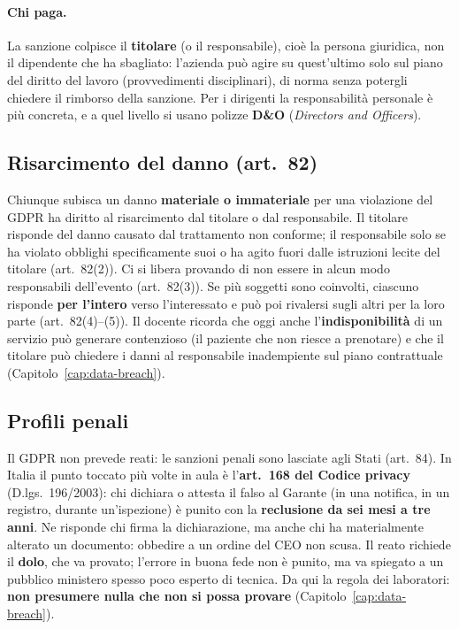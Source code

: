 \paragraph{Chi paga.} La sanzione colpisce il \textbf{titolare} (o il responsabile), cioè la persona
giuridica, non il dipendente che ha sbagliato: l'azienda può agire su quest'ultimo solo sul piano del
diritto del lavoro (provvedimenti disciplinari), di norma senza potergli chiedere il rimborso della
sanzione. Per i dirigenti la responsabilità personale è più concreta, e a quel livello si usano polizze
\textbf{D\&O} (\emph{Directors and Officers}).

\subsection{Risarcimento del danno (art.~82)}
Chiunque subisca un danno \textbf{materiale o immateriale} per una violazione del GDPR ha diritto al
risarcimento dal titolare o dal responsabile. Il titolare risponde del danno causato dal trattamento non
conforme; il responsabile solo se ha violato obblighi specificamente suoi o ha agito fuori dalle
istruzioni lecite del titolare (art.~82(2)). Ci si libera provando di non essere in alcun modo
responsabili dell'evento (art.~82(3)). Se più soggetti sono coinvolti, ciascuno risponde
\textbf{per l'intero} verso l'interessato e può poi rivalersi sugli altri per la loro parte
(art.~82(4)--(5)). Il docente ricorda che oggi anche l'\textbf{indisponibilità} di un servizio può
generare contenzioso (il paziente che non riesce a prenotare) e che il titolare può chiedere i danni al
responsabile inadempiente sul piano contrattuale (Capitolo~\ref{cap:data-breach}).

\subsection{Profili penali}
Il GDPR non prevede reati: le sanzioni penali sono lasciate agli Stati (art.~84). In Italia il punto
toccato più volte in aula è l'\textbf{art.~168 del Codice privacy} (D.lgs.~196/2003): chi dichiara o
attesta il falso al Garante (in una notifica, in un registro, durante un'ispezione) è punito con la
\textbf{reclusione da sei mesi a tre anni}. Ne risponde chi firma la dichiarazione, ma anche chi ha
materialmente alterato un documento: obbedire a un ordine del CEO non scusa. Il reato richiede il
\textbf{dolo}, che va provato; l'errore in buona fede non è punito, ma va spiegato a un pubblico ministero
spesso poco esperto di tecnica. Da qui la regola dei laboratori: \textbf{non presumere nulla che non si
possa provare} (Capitolo~\ref{cap:data-breach}).

